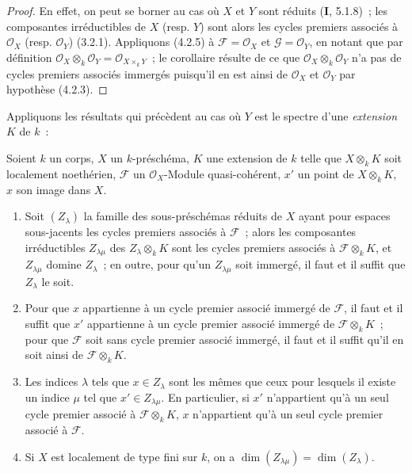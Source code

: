 \begin{proof}
En effet, on peut se borner au cas où $X$ et $Y$ sont réduits (\textbf{I}, 5.1.8)~; les
composantes irréductibles de $X$ (resp. $Y$) sont alors les cycles premiers
associés à $\mathcal O_X$ (resp. $\mathcal O_Y$) (3.2.1). Appliquons (4.2.5)
à $\mathcal F=\mathcal O_X$ et $\mathcal G=\mathcal O_Y$, en notant que par
définition $\mathcal O_X\otimes_k\mathcal O_Y=\mathcal O_{X\times_k Y}$~; le
corollaire résulte de ce que $\mathcal O_X\otimes_k\mathcal O_Y$ n'a pas de
cycles premiers associés immergés puisqu'il en est ainsi de $\mathcal O_X$ et
$\mathcal O_Y$ par hypothèse (4.2.3).
\end{proof}

Appliquons les résultats qui précèdent au cas où $Y$ est le spectre d'une
\emph{extension} $K$ de $k$~:

\begin{proposition}[4.2.7]
\label{IV.2.4.2.7-fr}
Soient $k$ un corps, $X$ un $k$-préschéma, $K$ une extension de $k$ telle que
$X\otimes_k K$ soit localement noethérien, $\mathcal F$ un
$\mathcal O_X$-Module quasi-cohérent, $x'$ un point de $X\otimes_k K$, $x$
son image dans $X$.
\begin{enumerate}
\item[\textup{(i)}] Soit $(Z_\lambda)$ la famille des sous-préschémas réduits de $X$
ayant pour espaces sous-jacents les cycles premiers associés à $\mathcal F$~;
alors les composantes irréductibles $Z_{\lambda\mu}$ des
$Z_\lambda\otimes_k K$ sont les cycles premiers associés à
$\mathcal F\otimes_k K$, et $Z_{\lambda\mu}$ domine $Z_\lambda$~; en outre,
pour qu'un $Z_{\lambda\mu}$ soit immergé, il faut et il suffit que $Z_\lambda$
le soit.
\item[\textup{(ii)}] Pour que $x$ appartienne à un cycle premier associé immergé de
$\mathcal F$, il faut et il suffit que $x'$ appartienne à un cycle premier
associé immergé de $\mathcal F\otimes_k K$~; pour que $\mathcal F$ soit sans
cycle premier associé immergé, il faut et il suffit qu'il en soit ainsi de
$\mathcal F\otimes_k K$.


\item[\textup{(iii)}] Les indices $\lambda$ tels que $x\in Z_\lambda$ sont les mêmes
que ceux pour lesquels il existe un indice $\mu$ tel que
$x'\in Z_{\lambda\mu}$. En particulier, si $x'$ n'appartient qu'à un seul
cycle premier associé à $\mathcal F\otimes_k K$, $x$ n'appartient qu'à un
seul cycle premier associé à $\mathcal F$.
\item[\textup{(iv)}] Si $X$ est localement de type fini sur $k$, on a
$\dim(Z_{\lambda\mu})=\dim(Z_\lambda)$.
\end{enumerate}
\end{proposition}

